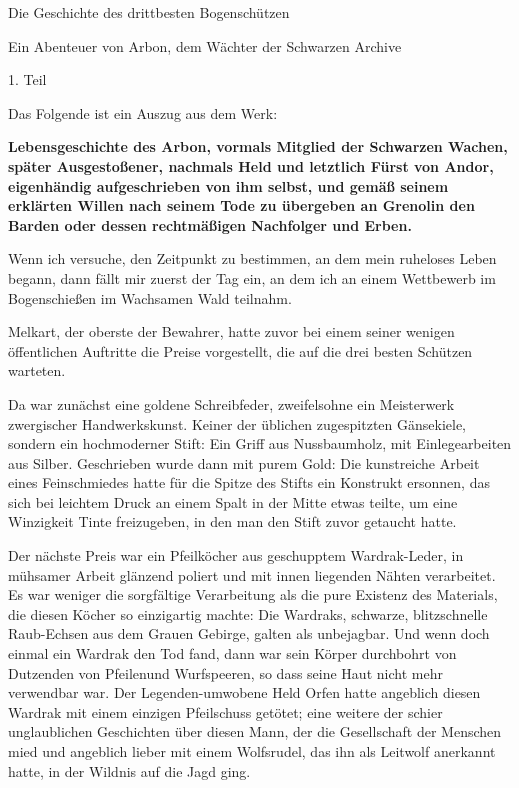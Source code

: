 \documentclass[10pt, a4paper, oneside]{book}
\begin{document}
\begin{multicols}{2}
Die Geschichte des drittbesten Bogenschützen

Ein Abenteuer von Arbon, dem Wächter der Schwarzen Archive

1. Teil\bigskip

Das Folgende ist ein Auszug aus dem Werk:

\textbf{Lebensgeschichte des Arbon, vormals Mitglied der Schwarzen Wachen, später Ausgestoßener, nachmals Held und letztlich Fürst von Andor, eigenhändig aufgeschrieben von ihm selbst, und gemäß seinem erklärten Willen nach seinem Tode zu übergeben an Grenolin den Barden oder dessen rechtmäßigen Nachfolger und Erben.}\bigskip

Wenn ich versuche, den Zeitpunkt zu bestimmen, an dem mein ruheloses Leben begann, dann fällt mir zuerst der Tag ein, an dem ich an einem Wettbewerb im Bogenschießen im Wachsamen Wald teilnahm.

Melkart, der oberste der Bewahrer, hatte zuvor bei einem seiner wenigen öffentlichen Auftritte die Preise vorgestellt, die auf die drei besten Schützen warteten.

Da war zunächst eine goldene Schreibfeder, zweifelsohne ein Meisterwerk zwergischer Handwerkskunst. Keiner der üblichen zugespitzten Gänsekiele, sondern ein hochmoderner Stift: Ein Griff aus Nussbaumholz, mit Einlegearbeiten aus Silber. Geschrieben wurde dann mit purem Gold: Die kunstreiche Arbeit eines Feinschmiedes hatte für die Spitze des Stifts ein Konstrukt ersonnen, das sich bei leichtem Druck an einem Spalt in der Mitte etwas teilte, um eine Winzigkeit Tinte freizugeben, in den man den Stift zuvor getaucht hatte.

Der nächste Preis war ein Pfeilköcher aus geschupptem Wardrak-Leder, in mühsamer Arbeit glänzend poliert und mit innen liegenden Nähten verarbeitet. Es war weniger die sorgfältige Verarbeitung als die pure Existenz des Materials, die diesen Köcher so einzigartig machte: Die Wardraks, schwarze, blitzschnelle Raub-Echsen aus dem Grauen Gebirge, galten als unbejagbar. Und wenn doch einmal ein Wardrak den Tod fand, dann war sein Körper durchbohrt von Dutzenden von Pfeilenund Wurfspeeren, so dass seine Haut nicht mehr verwendbar war. Der Legenden-umwobene Held Orfen hatte angeblich diesen Wardrak mit einem einzigen Pfeilschuss getötet; eine weitere der schier unglaublichen Geschichten über diesen Mann, der die Gesellschaft der Menschen mied und angeblich lieber mit einem Wolfsrudel, das ihn als Leitwolf anerkannt hatte, in der Wildnis auf die Jagd ging.


\end{multicols}
\end{document}
